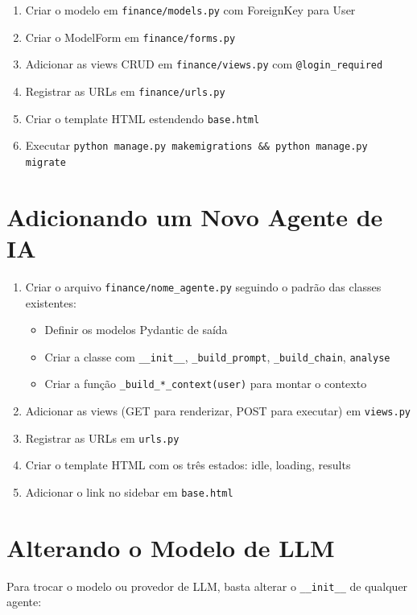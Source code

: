 \documentclass[12pt, a4paper, oneside]{report}
\begin{document}
\begin{enumerate}
  \item Criar o modelo em \texttt{finance/models.py} com ForeignKey para User
  \item Criar o ModelForm em \texttt{finance/forms.py}
  \item Adicionar as views CRUD em \texttt{finance/views.py} com \texttt{@login\_required}
  \item Registrar as URLs em \texttt{finance/urls.py}
  \item Criar o template HTML estendendo \texttt{base.html}
  \item Executar \texttt{python manage.py makemigrations \&\& python manage.py migrate}
\end{enumerate}

\section{Adicionando um Novo Agente de IA}

\begin{enumerate}
  \item Criar o arquivo \texttt{finance/nome\_agente.py} seguindo o padrão das classes existentes:
    \begin{itemize}
      \item Definir os modelos Pydantic de saída
      \item Criar a classe com \texttt{\_\_init\_\_}, \texttt{\_build\_prompt}, \texttt{\_build\_chain}, \texttt{analyse}
      \item Criar a função \texttt{\_build\_*\_context(user)} para montar o contexto
    \end{itemize}
  \item Adicionar as views (GET para renderizar, POST para executar) em \texttt{views.py}
  \item Registrar as URLs em \texttt{urls.py}
  \item Criar o template HTML com os três estados: idle, loading, results
  \item Adicionar o link no sidebar em \texttt{base.html}
\end{enumerate}

\section{Alterando o Modelo de LLM}

Para trocar o modelo ou provedor de LLM, basta alterar o \texttt{\_\_init\_\_} de qualquer agente:
\end{document}
